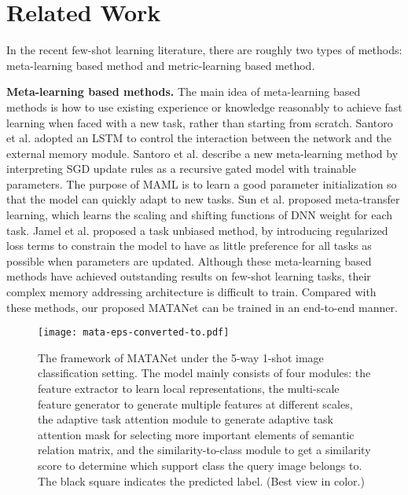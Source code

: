 \documentclass[final]{cvpr}
\begin{document}
	\section{Related Work}
	In the recent few-shot learning literature, there are roughly two types of methods: meta-learning based method and metric-learning based method.
	
	\textbf{Meta-learning based methods.} 
	The main idea of meta-learning based methods \cite{ravi2016optimization,finn2017model,sun2019meta,jamal2019task} is how to use existing experience or knowledge reasonably to achieve fast learning when faced with a new task, rather than starting from scratch.
	Santoro et al. \cite{santoro2016meta} adopted an LSTM to control the interaction between the network and the external memory module. 
	Santoro et al. \cite{ravi2016optimization} describe a new meta-learning method by interpreting SGD update rules as a recursive gated model with trainable parameters.
	The purpose of MAML \cite{finn2017model} is to learn a good parameter initialization so that the model can quickly adapt to new tasks.
	Sun et al. \cite{sun2019meta} proposed meta-transfer learning, which learns the scaling and shifting functions of DNN weight for each task.
	Jamel et al. \cite{jamal2019task} proposed a task unbiased method, by introducing regularized loss terms to constrain the model to have as little preference for all tasks as possible when parameters are updated.
	Although these meta-learning based methods have achieved outstanding results on few-shot learning tasks, their complex memory addressing architecture is difficult to train. Compared with these methods, our proposed MATANet can be trained in an end-to-end manner. 
	\begin{figure*}[t]
		\centering
		\texttt{[image: mata-eps-converted-to.pdf]}
		\caption{The framework of MATANet under the 5-way 1-shot image classification setting. The model mainly consists of four modules: the feature extractor  to learn local representations, the multi-scale feature generator  to generate multiple features at different scales, the adaptive task attention module  to generate adaptive task attention mask for selecting more important elements of semantic relation matrix, and the similarity-to-class module  to get a similarity score to determine which support class the query image belongs to. The black square indicates the predicted label. (Best view in color.)}
		\label{atanet_architecture}
	\end{figure*}
	
\end{document}
